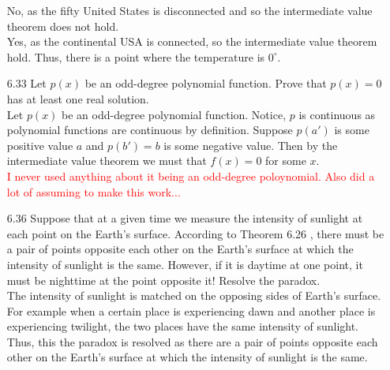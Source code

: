 \documentclass[12pt]{article}
\begin{document}
\begin{enumerate}
		No, as the fifty United States is disconnected and so the intermediate value theorem does not hold.\\
		Yes, as the continental USA is connected, so the intermediate value theorem hold. Thus, there is a point where the temperature is $ 0^\circ $. 
		
		\item[6.33] Let $p ( x )$ be an odd-degree polynomial function. Prove that $p ( x ) = 0$ has at least one real solution.\\
		Let $ p(x) $ be an odd-degree polynomial function. Notice, $ p $ is continuous as polynomial functions are continuous by definition. Suppose $ p(a') $ is some positive value $ a $ and $ p(b') = b $ is some negative value. Then by the intermediate value theorem we must that $ f(x)=0 $ for some $ x $.\\
		\textcolor{red}{I never used anything about it being an odd-degree poloynomial. Also did a lot of assuming to make this work...}
		
		\item[6.36] Suppose that at a given time we measure the intensity of sunlight at each point on the Earth's surface. According to Theorem 6.26 , there must be a pair of points
		opposite each other on the Earth's surface at which the intensity of sunlight is the same. However, if it is daytime at one point, it must be nighttime at the
		point opposite it! Resolve the paradox.\\
		The intensity of sunlight is matched on the opposing sides of Earth's surface. For example when a certain place is experiencing dawn and another place is experiencing twilight, the two places have the same intensity of sunlight. Thus, this the paradox is resolved as there are a pair of points opposite each other on the Earth's surface at which the intensity of sunlight is the same.
		

\end{enumerate}
\end{document}
